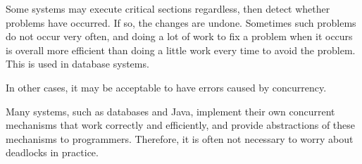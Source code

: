 Some systems may execute critical sections regardless, then detect whether problems have occurred.
If so, the changes are undone.
Sometimes such problems do not occur very often, and doing a lot of work to fix a problem when it occurs is overall more efficient than doing a little work every time to avoid the problem.
This is used in database systems.

In other cases, it may be acceptable to have errors caused by concurrency.

Many systems, such as databases and Java, implement their own concurrent mechanisms that work correctly and efficiently, and provide abstractions of these mechanisms to programmers.
Therefore, it is often not necessary to worry about deadlocks in practice.
